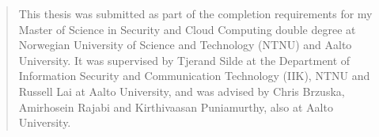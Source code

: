 \renewcommand{\abstractname}{\prefacename}
\begin{abstract}
\noindent 
This thesis was submitted as part of the completion requirements for my Master of Science in Security and Cloud Computing double degree at Norwegian University of Science and Technology (NTNU) and Aalto University. It was supervised by Tjerand Silde at the Department of Information Security and Communication Technology (IIK), NTNU and Russell Lai at Aalto University, and was advised by Chris Brzuska, Amirhosein Rajabi and Kirthivaasan Puniamurthy, also at Aalto University.


\end{abstract}
\cleardoublepage